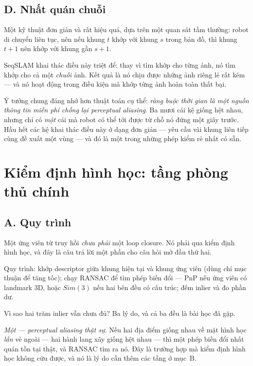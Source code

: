 \documentclass[../../vslam.tex]{subfiles}
\begin{document}
\subsection{D. Nhất quán chuỗi}

Một kỹ thuật đơn giản và rất hiệu quả, dựa trên một quan sát tầm thường: robot di chuyển liên tục, nên nếu khung \(t\) khớp với khung \(s\) trong bản đồ, thì khung \(t+1\) nên khớp với khung gần \(s+1\).

SeqSLAM \cite{milford2012seqslam} khai thác điều này triệt để: thay vì tìm khớp cho từng ảnh, nó tìm khớp cho cả một \emph{chuỗi} ảnh. Kết quả là nó chịu được những ảnh riêng lẻ rất kém --- và nó hoạt động trong điều kiện mà khớp từng ảnh hoàn toàn thất bại.

Ý tưởng chung đáng nhớ hơn thuật toán cụ thể: \emph{ràng buộc thời gian là một nguồn thông tin miễn phí chống lại perceptual aliasing}. Ba mươi cái kệ giống hệt nhau, nhưng chỉ có \emph{một} cái mà robot có thể tới được từ chỗ nó đứng một giây trước. Hầu hết các hệ khai thác điều này ở dạng đơn giản --- yêu cầu vài khung liên tiếp cùng đề xuất một vùng --- và đó là một trong những phép kiểm rẻ nhất có sẵn.

\section{Kiểm định hình học: tầng phòng thủ chính}

\subsection{A. Quy trình}

Một ứng viên từ truy hồi \emph{chưa phải} một loop closure. Nó phải qua kiểm định hình học, và đây là câu trả lời một phần cho câu hỏi mở đầu thứ hai.

Quy trình: khớp descriptor giữa khung hiện tại và khung ứng viên (dùng chỉ mục thuận để tăng tốc); chạy RANSAC để tìm phép biến đổi --- PnP nếu ứng viên có landmark \(3\)D, hoặc \(Sim(3)\) nếu hai bên đều có cấu trúc; đếm inlier và đo phần dư.

Vì sao hai trăm inlier vẫn chưa đủ? Ba lý do, và cả ba đều là bài học đã gặp.

\emph{Một --- perceptual aliasing thật sự.} Nếu hai địa điểm giống nhau về mặt hình học \emph{lẫn} vẻ ngoài --- hai hành lang xây giống hệt nhau --- thì một phép biến đổi nhất quán tồn tại thật, và RANSAC tìm ra nó. Đây là trường hợp mà kiểm định hình học không cứu được, và nó là lý do cần thêm các tầng ở mục~B.
\end{document}
